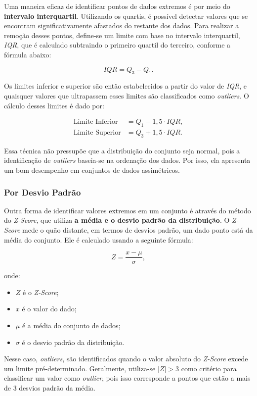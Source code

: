 Uma maneira eficaz de identificar pontos de dados extremos é por meio do \textbf{intervalo interquartil}. Utilizando os quartis, é possível detectar valores que se encontram significativamente afastados do restante dos dados. Para realizar a remoção desses pontos, define-se um limite com base no intervalo interquartil, \textit{IQR}, que é calculado subtraindo o primeiro quartil do terceiro, conforme a fórmula abaixo:

\[
IQR = Q_3 - Q_1.
\]

Os limites inferior e superior são então estabelecidos a partir do valor de \textit{IQR}, e quaisquer valores que ultrapassem esses limites são classificados como \textit{outliers}. O cálculo desses limites é dado por:

\begin{align*}
\text{Limite Inferior} &= Q_1 - 1,5 \cdot IQR, \\
\text{Limite Superior} &= Q_3 + 1,5 \cdot IQR.
\end{align*}

Essa técnica não pressupõe que a distribuição do conjunto seja normal, pois a identificação de \textit{outliers} baseia-se na ordenação dos dados. Por isso, ela apresenta um bom desempenho em conjuntos de dados assimétricos.

\subsubsection{Por Desvio Padrão}

Outra forma de identificar valores extremos em um conjunto é através do método do \textit{Z-Score}, que utiliza \textbf{a média e o desvio padrão da distribuição}. O \textit{Z-Score} mede o quão distante, em termos de desvios padrão, um dado ponto está da média do conjunto. Ele é calculado usando a seguinte fórmula:

\[
Z = \frac{x - \mu}{\sigma},
\]

\noindent
onde:
\begin{itemize}
    \item \( Z \) é o \textit{Z-Score};
    \item \( x \) é o valor do dado;
    \item \( \mu \) é a média do conjunto de dados;
    \item \( \sigma \) é o desvio padrão da distribuição.
\end{itemize}

Nesse caso, \textit{outliers}, são identificados quando o valor absoluto do \textit{Z-Score} excede um limite pré-determinado. Geralmente, utiliza-se \( |Z| > 3 \) como critério para classificar um valor como \textit{outlier}, pois isso corresponde a pontos que estão a mais de 3 desvios padrão da média.

